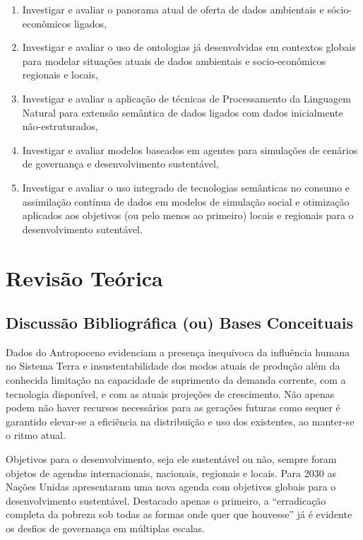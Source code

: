 \documentclass[
	12pt,				%
	openany,			%
	oneside,			%
	a4paper,			%
	english,			%
	french,				%
	spanish,			%
	brazil,				%
	]{abntex2}
\begin{document}
\begin{enumerate}
	\item Investigar e avaliar o panorama atual de oferta de dados ambientais e sócio-econômicos ligados,
	\item Investigar e avaliar o uso de ontologias já desenvolvidas em contextos globais para modelar situações atuais de dados ambientais e socio-econômicos regionais e locais,
	\item Investigar e avaliar a aplicação de técnicas de Processamento da Linguagem Natural para extensão semântica de dados ligados com dados inicialmente não-estruturados,
	\item Investigar e avaliar modelos baseados em agentes para simulações de cenários de governança e desenvolvimento sustentável,
	\item Investigar e avaliar o uso integrado de tecnologias semânticas no consumo e assimilação contínua de dados em modelos de simulação social e otimização aplicados aos objetivos (ou pelo menos ao primeiro) locais e regionais para o desenvolvimento sutentável.
\end{enumerate}

\chapter{Revisão Teórica}
\section{Discussão Bibliográfica (ou) Bases Conceituais}

Dados do Antropoceno evidenciam a presença inequívoca da influência humana no Sistema Terra e insustentabilidade dos modos atuais de produção além da conhecida limitação na capacidade de suprimento da demanda corrente, com a tecnologia disponível, e com as atuais projeções de crescimento. Não apenas podem não haver recursos necessários para as gerações futuras como sequer é garantido elevar-se a eficiência na distribuição e uso dos existentes, ao manter-se o ritmo atual.

Objetivos para o desenvolvimento, seja ele sustentável ou não, sempre foram objetos de agendas internacionais, nacionais, regionais e locais. Para 2030 as Nações Unidas apresentaram uma nova agenda com objetivos globais para o desenvolvimento sustentável. Destacado apenas o primeiro, a ``erradicação completa da pobreza sob todas as formas onde quer que houvesse''\cite{united_nations_transforming_2015} já é evidente os desfios de governança em múltiplas escalas.
\end{document}
